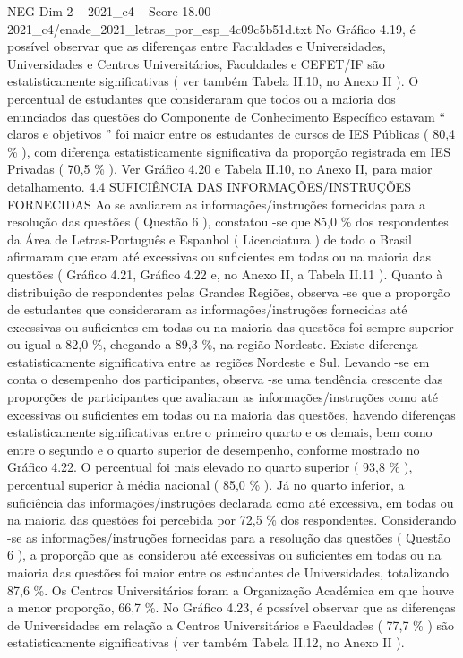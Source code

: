 \begin{textsample}{NEG Dim 2 – 2021\_c4 – Score 18.00 – 2021\_c4/enade\_2021\_letras\_por\_esp\_4c09c5b51d.txt}
No Gráfico 4.19, é possível observar que as diferenças entre Faculdades e Universidades, Universidades e Centros Universitários, Faculdades e CEFET/IF são estatisticamente significativas ( ver também Tabela II.10, no Anexo II ).
O percentual de estudantes que consideraram que todos ou a maioria dos enunciados das questões do Componente de Conhecimento Específico estavam “ claros e objetivos ” foi maior entre os estudantes de cursos de IES Públicas ( 80,4 \% ), com diferença estatisticamente significativa da proporção registrada em IES Privadas ( 70,5 \% ).
Ver Gráfico 4.20 e Tabela II.10, no Anexo II, para maior detalhamento. 4.4 SUFICIÊNCIA DAS INFORMAÇÕES/INSTRUÇÕES FORNECIDAS Ao se avaliarem as informações/instruções fornecidas para a resolução das questões ( Questão 6 ), constatou -se que 85,0 \% dos respondentes da Área de Letras-Português e Espanhol ( Licenciatura ) de todo o Brasil afirmaram que eram até excessivas ou suficientes em todas ou na maioria das questões ( Gráfico 4.21, Gráfico 4.22 e, no Anexo II, a Tabela II.11 ).
Quanto à distribuição de respondentes pelas Grandes Regiões, observa -se que a proporção de estudantes que consideraram as informações/instruções fornecidas até excessivas ou suficientes em todas ou na maioria das questões foi sempre superior ou igual a 82,0 \%, chegando a 89,3 \%, na região Nordeste.
Existe diferença estatisticamente significativa entre as regiões Nordeste e Sul.
Levando -se em conta o desempenho dos participantes, observa -se uma tendência crescente das proporções de participantes que avaliaram as informações/instruções como até excessivas ou suficientes em todas ou na maioria das questões, havendo diferenças estatisticamente significativas entre o primeiro quarto e os demais, bem como entre o segundo e o quarto superior de desempenho, conforme mostrado no Gráfico 4.22.
O percentual foi mais elevado no quarto superior ( 93,8 \% ), percentual superior à média nacional ( 85,0 \% ).
Já no quarto inferior, a suficiência das informações/instruções declarada como até excessiva, em todas ou na maioria das questões foi percebida por 72,5 \% dos respondentes.
Considerando -se as informações/instruções fornecidas para a resolução das questões ( Questão 6 ), a proporção que as considerou até excessivas ou suficientes em todas ou na maioria das questões foi maior entre os estudantes de Universidades, totalizando 87,6 \%.
Os Centros Universitários foram a Organização Acadêmica em que houve a menor proporção, 66,7 \%.
No Gráfico 4.23, é possível observar que as diferenças de Universidades em relação a Centros Universitários e Faculdades ( 77,7 \% ) são estatisticamente significativas ( ver também Tabela II.12, no Anexo II ).

\end{textsample}
